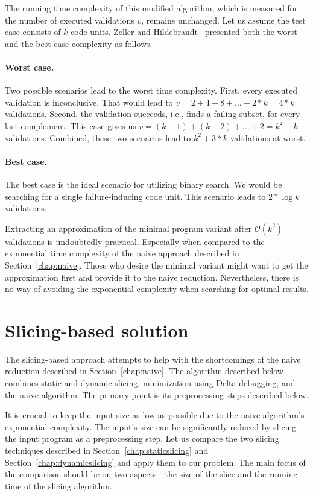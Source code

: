 The running time complexity of this modified algorithm, which is measured 
for the number of executed validations $v$, remains unchanged. 
Let us assume the test case consists of $k$ code units. 
Zeller and Hildebrandt~\citep*{Zeller02} presented both the worst 
and the best case complexity as follows.

\paragraph{Worst case.} Two possible scenarios lead to the worst time 
complexity. 
First, every executed validation is inconclusive. 
That would lead to $v = 2 + 4 + 8 + \ldots + 2 * k = 4 * k$ validations. 
Second, the validation succeeds, i.e., finds a failing subset, for every 
last complement. 
This case gives us $v = (k - 1) + (k - 2) + \ldots + 2 = k^2 - k$ validations.
Combined, these two scenarios lead to $k^2 + 3 * k$ validations at worst.

\paragraph{Best case.} The best case is the ideal scenario for utilizing 
binary search. 
We would be searching for a single failure-inducing code unit. 
This scenario leads to $2 * \log{}k$ validations.

Extracting an approximation of the minimal program variant after 
$\mathcal{O}(k^2)$ validations is undoubtedly practical. 
Especially when compared to the exponential time complexity of the naive 
approach described in Section~\ref{chap:naive}. 
Those who desire the minimal variant might want to get the approximation 
first and provide it to the naive reduction. 
Nevertheless, there is no way of avoiding the exponential complexity when 
searching for optimal results.

\section{Slicing-based solution}\label{chap:systematic}

The slicing-based approach attempts to help with the shortcomings of 
the naive reduction described in Section~\ref{chap:naive}.
The algorithm described below combines static and dynamic slicing, 
minimization using Delta debugging, and the naive algorithm. 
The primary point is its preprocessing steps described below. 

It is crucial to keep the input size as low as possible due to the naive 
algorithm's exponential complexity.  
The input's size can be significantly reduced by slicing the input program 
as a preprocessing step.  
Let us compare the two slicing techniques described 
in Section~\ref{chap:staticslicing} and Section~\ref{chap:dynamicslicing} and 
apply them to our problem. 
The main focus of the comparison should be on two aspects - the size of 
the slice and the running time of the slicing algorithm. 

